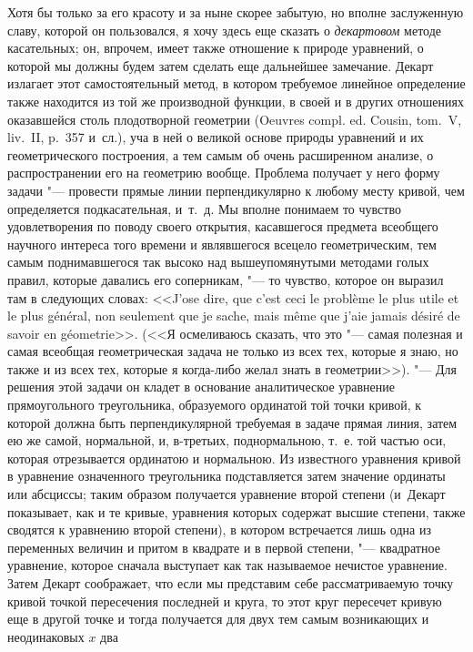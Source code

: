 Хотя бы только за его красоту и за ныне скорее забытую, но вполне заслуженную
славу, которой он пользовался, я хочу здесь еще сказать о {\em декартовом}
методе касательных; он, впрочем, имеет также отношение к природе уравнений, о
которой мы должны будем затем сделать еще дальнейшее замечание. Декарт излагает
этот самостоятельный метод, в котором требуемое линейное определение также
находится из той же производной функции, в своей и в других отношениях
оказавшейся столь плодотворной геометрии (Oeuvres compl. ed. Cousin, tom.~V,
liv.~II, p.~357 и~сл.), уча в ней о великой основе природы уравнений и их
геометрического построения, а тем самым об очень расширенном анализе, о
распространении его на геометрию вообще. Проблема получает у него форму задачи
"--- провести прямые линии перпендикулярно к любому месту кривой, чем
определяется подкасательная, и~т.~д. Мы вполне понимаем то чувство
удовлетворения по поводу своего открытия, касавшегося предмета всеобщего
научного интереса того времени и являвшегося всецело геометрическим, тем самым
поднимавшегося так высоко над вышеупомянутыми методами голых правил, которые
давались его соперникам, "--- то чувство, которое он выразил там в следующих
словах: <<J’ose dire, que c’est ceci le problème le plus utile et le plus
général, non seulement que je sache, mais même que j’aie jamais désiré de
savoir en géometrie>>. (<<Я осмеливаюсь сказать, что это "--- самая полезная и
самая всеобщая геометрическая задача не только из всех тех, которые я знаю, но
также и из всех тех, которые я когда-либо желал знать в геометрии>>). "--- Для
решения этой задачи он кладет в основание аналитическое уравнение
прямоугольного треугольника, образуемого ординатой той точки кривой, к которой
должна быть перпендикулярной требуемая в задаче прямая линия, затем ею же
самой, нормальной, и, в-третьих, поднормальною, т.~е. той частью оси, которая
отрезывается ординатою и нормальною. Из известного уравнения кривой в уравнение
означенного треугольника подставляется затем значение ординаты или абсциссы;
таким образом получается уравнение второй степени (и~Декарт показывает, как и
те кривые, уравнения которых содержат высшие степени, также сводятся к
уравнению второй степени), в котором встречается лишь одна из переменных
величин и притом в квадрате и в первой степени, "--- квадратное уравнение,
которое сначала выступает как так называемое нечистое уравнение. Затем Декарт
соображает, что если мы представим себе рассматриваемую точку кривой точкой
пересечения последней и круга, то этот круг пересечет кривую еще в другой точке
и тогда получается для двух тем самым возникающих и неодинаковых $x$ два

